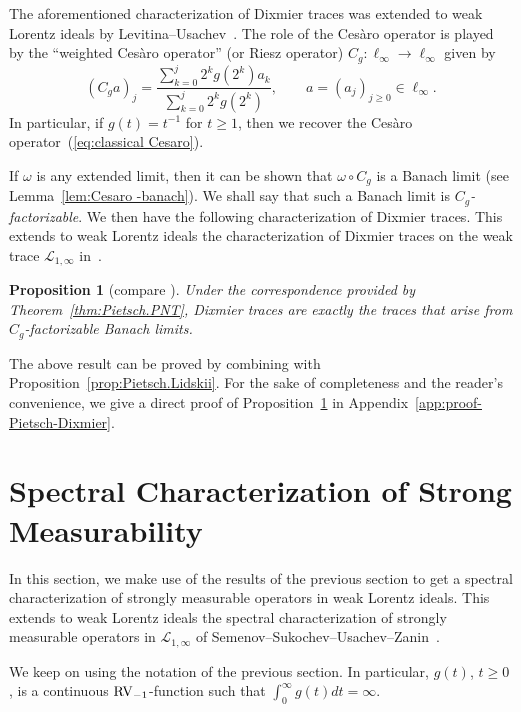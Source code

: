 \documentclass[10pt, a4paper]{amsart}
\newcommand{\sL}{\mathscr{L}}
\numberwithin{equation}{section}
\newtheorem{proposition}[theorem]{Proposition}
\theoremstyle{definition}
\theoremstyle{remark}
\newcommand{\RV}{\textup{RV}}
\begin{document}
The aforementioned characterization of Dixmier traces was extended to weak Lorentz ideals by Levitina--Usachev~\cite{LU:JMAA25}. The role of the Ces\`aro operator is played by the ``weighted Ces\`aro operator'' (or Riesz operator) $C_g:\ell_\infty\rightarrow \ell_\infty$ given by
 \begin{equation*}
 (C_ga)_j = \frac{\sum_{k=0}^{j} 2^k g(2^k)a_k}{\sum_{k=0}^{j}  2^k g(2^k)}, \qquad a=(a_j)_{j \geq 0} \in \ell_\infty.
\end{equation*}
In particular, if $g(t)=t^{-1}$ for $t\geq 1$, then we recover the Ces\`aro operator~(\ref{eq:classical Cesaro}).

If $\omega$ is any extended limit, then it can be shown that $\omega\circ C_g$ is a Banach limit (see Lemma~\ref{lem:Cesaro -banach}). We shall say that such a Banach limit is \emph{$C_g$-factorizable}. We then have the following characterization of Dixmier traces. This extends to weak Lorentz ideals the characterization of Dixmier traces on the weak trace $\sL_{1,\infty}$ in~\cite{LSZ:Book, SSUZ:AIM15}.

 \begin{proposition}[compare {\cite[Theorem~4.7]{LU:JMAA25}}]\label{prop:Pietsch-Dixmier}
 Under the correspondence provided by Theorem~\ref{thm:Pietsch.PNT}, Dixmier traces are exactly the traces that arise from $C_g$-factorizable Banach limits.
\end{proposition}

The above result can be proved by combining \cite[Theorem~4.7]{LU:JMAA25} with Proposition~\ref{prop:Pietsch.Lidskii}. For the sake of completeness and the reader's convenience, we give a direct proof of Proposition~\ref{prop:Pietsch-Dixmier} in Appendix~\ref{app:proof-Pietsch-Dixmier}.

\section{Spectral Characterization of Strong Measurability}\label{sec:strong-hyper}
In this section, we make use of the results of the previous section to get a spectral characterization of strongly measurable operators in weak Lorentz ideals. This extends to weak Lorentz ideals the spectral characterization of strongly measurable operators in $\sL_{1,\infty}$ of Semenov--Sukochev--Usachev--Zanin~\cite[Proposition~7.2]{SSUZ:AIM15}. 

We keep on using the notation of the previous section. In particular, $g(t)$, $t\geq 0$, is a continuous $\RV_{-1}$-function such that $\int_0^\infty g(t)dt=\infty$. 
\end{document}
